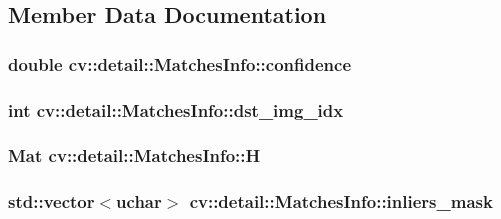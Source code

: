 \subsection{Member Data Documentation}
\hypertarget{structcv_1_1detail_1_1MatchesInfo_aa3e33ded91e2b39e21e943436f224eeb}{
\subsubsection[{confidence}]{\setlength{\rightskip}{0pt plus 5cm}double cv\-::detail\-::\-Matches\-Info\-::confidence}}\label{structcv_1_1detail_1_1MatchesInfo_aa3e33ded91e2b39e21e943436f224eeb}
\hypertarget{structcv_1_1detail_1_1MatchesInfo_a1f0c77660d4fcff5caeacd18dda1fa7e}{
\subsubsection[{dst\-\_\-img\-\_\-idx}]{\setlength{\rightskip}{0pt plus 5cm}int cv\-::detail\-::\-Matches\-Info\-::dst\-\_\-img\-\_\-idx}}\label{structcv_1_1detail_1_1MatchesInfo_a1f0c77660d4fcff5caeacd18dda1fa7e}
\hypertarget{structcv_1_1detail_1_1MatchesInfo_a7cb8ab58870d3190fba157dc82309573}{
\subsubsection[{H}]{\setlength{\rightskip}{0pt plus 5cm}Mat cv\-::detail\-::\-Matches\-Info\-::\-H}}\label{structcv_1_1detail_1_1MatchesInfo_a7cb8ab58870d3190fba157dc82309573}
\hypertarget{structcv_1_1detail_1_1MatchesInfo_a6ff92ca46d2d3f23a80a0bd4303e356f}{
\subsubsection[{inliers\-\_\-mask}]{\setlength{\rightskip}{0pt plus 5cm}std\-::vector$<${\bf uchar}$>$ cv\-::detail\-::\-Matches\-Info\-::inliers\-\_\-mask}}\label{structcv_1_1detail_1_1MatchesInfo_a6ff92ca46d2d3f23a80a0bd4303e356f}

